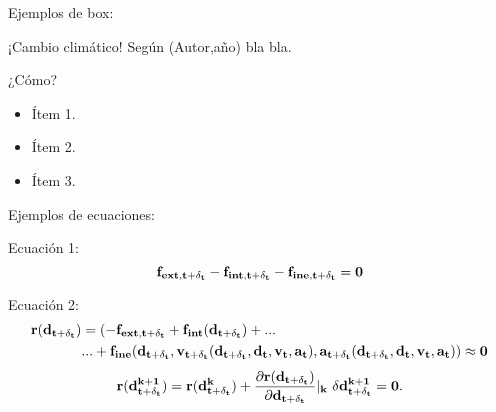 \documentclass[
  aspectratio=169,
]{beamer}
\begin{document}
\begin{small}
\begin{frame}{Ejemplos de box:}{}

\begin{alertblock}{¡Cambio climático!}
	Según {\color{blue}(Autor,año)} bla bla.
\end{alertblock}

\pause

\begin{block}{¿Cómo?}
	\begin{itemize}
		\item Ítem 1.
		\item Ítem 2.
		\item Ítem 3.
	\end{itemize}
\end{block}	


\end{frame}


\begin{frame}{Ejemplos de ecuaciones:}{}

	\begin{block}{Ecuación 1:}
		\begin{equation}\label{Eq:MET:EquilibrioExacto}
				\bf{f}_{ext,t+\delta_t}-\bf{f}_{int,t+\delta_t}-\bf{f}_{ine,t+\delta_t}=0
		\end{equation}
	\end{block}
\vfill
\begin{block}{Ecuación 2:}
	\begin{equation}\label{Eq:MET:Resto}
		\begin{split}
			\bf{r}(\bf{d}_{t+\delta_t})&=(-\bf{f}_{ext,t+\delta_t}+\bf{f}_{int}(\bf{d}_{t+\delta_t})+...\\	
			&...+\bf{f}_{ine}(\bf{d_{t+\delta_t}},\bf{v}_{t+\delta_t}(d_{t+\delta_t},\bf{d_t},\bf{v_t},\bf{a_t}),
			\bf{a}_{t+\delta_t}(d_{t+\delta_t},\bf{d_t},\bf{v_t},\bf{a_t}))
			\approx 0
		\end{split}
		\end{equation}
		\begin{equation}\label{Eq:MET:Residuo}
		\bf{r}(\bf{d}^{k+1}_{t+\delta_t})=\bf{r}(\bf{d}^k_{t+\delta_t}) +
		\frac{\partial  \bf{r}(\bf{d}_{t+\delta_t})}{\partial
			\bf{d}_{t+\delta_t}}|_k~\delta \bf{d}^{k+1}_{t+\delta_t}=0.
	\end{equation}
\end{block}
\end{frame}


\end{small}
\end{document}

